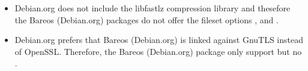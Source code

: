     \begin{itemize}
        \item Debian.org does not include the libfastlz compression library and thesefore the Bareos (Debian.org) packages do not offer the fileset options ,  and .
        \item Debian.org prefers that Bareos (Debian.org) is linked against GnuTLS instead of OpenSSL. Therefore, the Bareos (Debian.org) package only support  but no .
    \end{itemize}
